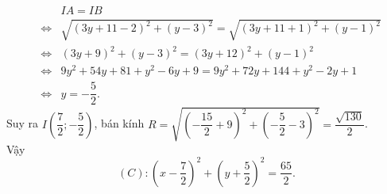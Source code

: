 \begin{bt}
{\begin{enumerate}
\begin{eqnarray*}
				&&IA=IB\\
				&\Leftrightarrow&\sqrt{(3y+11-2)^2+(y-3)^2}=\sqrt{(3y+11+1)^2+(y-1)^2}\\
				&\Leftrightarrow&(3y+9)^2+(y-3)^2=(3y+12)^2+(y-1)^2\\
				&\Leftrightarrow&9y^2+54y+81+y^2-6y+9=9y^2+72y+144+y^2-2y+1\\
				&\Leftrightarrow&y=-\dfrac{5}{2}.
			\end{eqnarray*}
			Suy ra $ I\left(\dfrac{7}{2};-\dfrac{5}{2}\right) $, bán kính $ R= \sqrt{\left(-\dfrac{15}{2}+9\right)^2+\left(-\dfrac{5}{2}-3\right)^2}=\dfrac{\sqrt{130}}{2}$.\\
			Vậy $$(C)\colon \left(x-\dfrac{7}{2}\right)^2+\left(y+\dfrac{5}{2}\right)^2=\dfrac{65}{2}.$$
		\end{enumerate}
	}
\end{bt}

